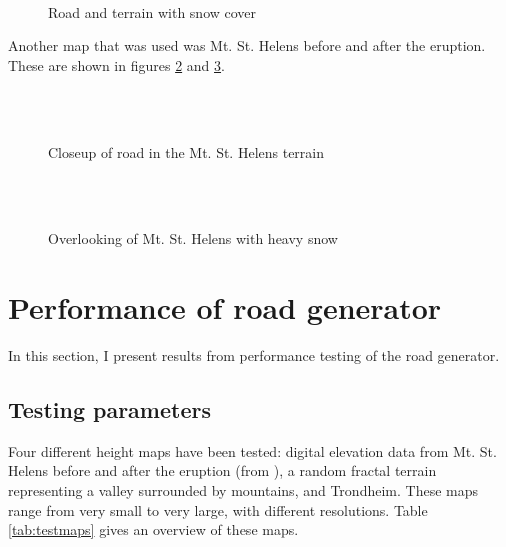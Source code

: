 \begin{figure}[ht]
\centering
{}\\
\quad
{}
\caption{Road and terrain with snow cover}
\label{fig:road_in_terrain_snow}
\end{figure}

Another map that was used was Mt. St. Helens before and after the eruption. These are shown in figures \ref{fig:helens_road_closeup} and \ref{fig:helens_overview_snow}.

\begin{figure}[H]
\centering
{}\\
\\
\caption{Closeup of road in the Mt. St. Helens terrain}
\label{fig:helens_road_closeup}
\end{figure}

\begin{figure}[H]
\centering
{}\\
\\
\caption{Overlooking of Mt. St. Helens with heavy snow}
\label{fig:helens_overview_snow}
\end{figure}
\section{Performance of road generator}
In this section, I present results from performance testing of the road generator. 

\subsection{Testing parameters}
Four different height maps have been tested: digital elevation data from Mt. St. Helens before and after the eruption (from \cite{helens_dem}), a random fractal terrain representing a valley surrounded by mountains, and Trondheim. These maps range from very small to very large, with different resolutions. Table \ref{tab:testmaps} gives an overview of these maps.

